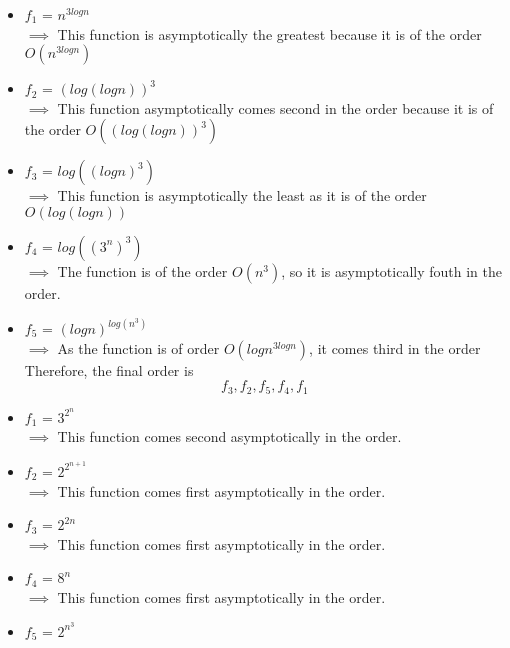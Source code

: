 \documentclass[12pt, twoside]{article}
\begin{document}
\begin{problems}
\begin{problemparts}
\problempart %
\begin{itemize}
    \item $f_1$ = $n^{3 log n}$ \\
    $\implies$ This function is asymptotically the greatest because it is of the order $O(n ^{3logn})$
    \newline 
    \item $f_2$ = $(log(log n))^3$ \\
    $\implies$  This function asymptotically comes second in the order because it is of the order $O((log(log n))^3)$
    \item $f_3$ = $log((log n)^3)$ \\
    $\implies$ This function is asymptotically the least as it is of the order $O(log(logn))$
    \newline 
    \item $f_4$ = $log((3^{n})^{3})$ \\
    $\implies$ The function is of the order $O(n^{3})$, so it is asymptotically fouth in the order.
    \newline 
    \item $f_5$ = $(logn)^{log(n^3)}$ \\
    $\implies$ As the function is of order $O(log n ^{3 log n})$, it comes third in the order
    \newline 
    Therefore, the final order is \\
    \[f_{3} ,f_{2}, f_{5}, f_{4},  f_{1}\]
\end{itemize}
\problempart %
\begin{itemize}
    \item $f_1$ = $3^{2^n}$ \\
    $\implies$ This function comes second asymptotically in the order.
    \newline 
    \item $f_2$ = $2^{2^{n+1}}$ \\
    $\implies$  This function comes first asymptotically in the order.
    \item $f_3$ = $2^{2n}$ \\
    $\implies$  This function comes first asymptotically in the order.
    \newline 
    \item $f_4$ = $8^{n}$ \\
    $\implies$ This function comes first asymptotically in the order.
    \newline 
    \item $f_5$ = $2^{n^{3}}$ \\

\end{itemize}
\end{problemparts}
\end{problems}
\end{document}

